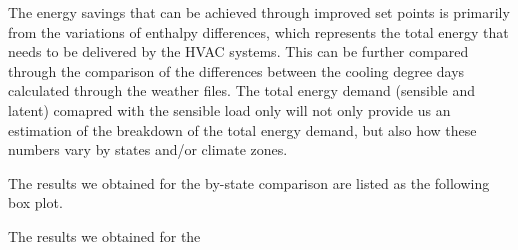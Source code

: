 The energy savings that can be achieved through improved set points is primarily from the variations of enthalpy differences, which represents the total energy that needs to be delivered by the HVAC systems. This can be further compared through the comparison of the differences between the cooling degree days calculated through the weather files. The total energy demand (sensible and latent) comapred with the sensible load only will not only provide us an estimation of the breakdown of the total energy demand, but also how these numbers vary by states and/or climate zones. 

The results we obtained for the by-state comparison are listed as the following box plot.


The results we obtained for the 